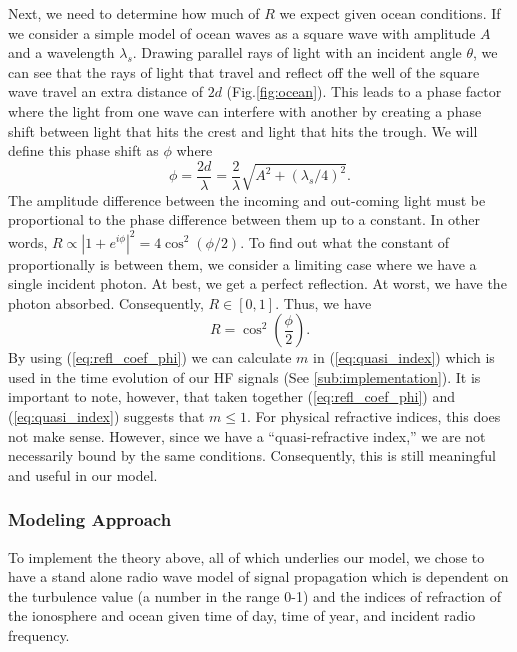 \documentclass[11pt]{article}
\numberwithin{equation}{section}
\begin{document}
Next, we need to determine how much of $R$ we expect given ocean conditions. If we consider a simple model of ocean waves as a square wave with amplitude $A$ and a wavelength $\lambda_s$. Drawing parallel rays of light with an incident angle $\theta$, we can see that the rays of light that travel and reflect off the well of the square wave travel an extra distance of $2d$ (Fig.\ref{fig:ocean}). This leads to a phase factor where the light from one wave can interfere with another by creating a phase shift between light that hits the crest and light that hits the trough. We will define this phase shift as $\phi$ where 
\begin{equation}
    \phi = \frac{2d}{\lambda} = \frac{2}{\lambda}\sqrt{A^2 + (\lambda_s/4)^2}.
\end{equation}
The amplitude difference between the incoming and out-coming light must be proportional to the phase difference between them up to a constant. In other words, $R \propto |1+e^{i\phi}|^2 = 4 \cos^2(\phi/2)$. To find out what the constant of proportionally is between them, we consider a limiting case where we have a single incident photon. At best, we get a perfect reflection. At worst, we have the photon absorbed. Consequently, $R \in [0,1]$. Thus, we have
\begin{equation}
    R =  \cos^2\left(\frac\phi2\right).
    \label{eq:refl_coef_phi}
\end{equation}
By using (\ref{eq:refl_coef_phi}) we can calculate $m$ in (\ref{eq:quasi_index}) which is used in the time evolution of our HF signals (See \ref{sub:implementation}). It is important to note, however, that taken together (\ref{eq:refl_coef_phi}) and (\ref{eq:quasi_index}) suggests that $m \le 1$. For physical refractive indices, this does not make sense. However, since we have a ``quasi-refractive index,'' we are not necessarily bound by the same conditions. Consequently, this is still meaningful and useful in our model.

\subsubsection{Modeling Approach}
To implement the theory above, all of which underlies our model, we chose to have a stand alone radio wave model of signal propagation which is dependent on the turbulence value (a number in the range 0-1) and the indices of refraction of the ionosphere and ocean given time of day, time of year, and incident radio frequency. 

\end{document}
